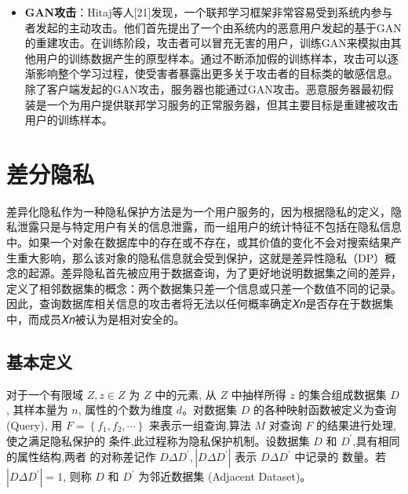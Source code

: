 \begin{itemize}
\item \textbf{GAN攻击}：Hitaj等人[21]发现，一个联邦学习框架非常容易受到系统内参与者发起的主动攻击。他们首先提出了一个由系统内的恶意用户发起的基于GAN的重建攻击。在训练阶段，攻击者可以冒充无害的用户，训练GAN来模拟由其他用户的训练数据产生的原型样本。通过不断添加假的训练样本，攻击可以逐渐影响整个学习过程，使受害者暴露出更多关于攻击者的目标类的敏感信息。除了客户端发起的GAN攻击，服务器也能通过GAN攻击。恶意服务器最初假装是一个为用户提供联邦学习服务的正常服务器，但其主要目标是重建被攻击用户的训练样本。

\end{itemize}


\section{差分隐私}
差异化隐私作为一种隐私保护方法是为一个用户服务的，因为根据隐私的定义，隐私泄露只是与特定用户有关的信息泄露，而一组用户的统计特征不包括在隐私信息中。如果一个对象在数据库中的存在或不存在，或其价值的变化不会对搜索结果产生重大影响，那么该对象的隐私信息就会受到保护，这就是差异性隐私（DP）概念的起源。差异隐私首先被应用于数据查询，为了更好地说明数据集之间的差异，定义了相邻数据集的概念：两个数据集只差一个信息或只差一个数值不同的记录。因此，查询数据库相关信息的攻击者将无法以任何概率确定𝑋𝑛是否存在于数据集中，而成员𝑋𝑛被认为是相对安全的。


\subsection{基本定义}
对于一个有限域 $Z, z \in Z$ 为 $Z$ 中的元素, 从 $Z$ 中抽样所得 $z$ 的集合组成数据集 $D$, 其样本量为 $n$, 属性的个数为维度 $d$。对数据集 $D$ 的各种映射函数被定义为查询 (Query), 用 $F=\left\{f_{1}, f_{2}, \cdots\right\}$ 来表示一组查询,算法 $M$ 对查询 $F$ 的结果进行处理,使之满足隐私保护的 条件,此过程称为隐私保护机制。设数据集 $D$ 和 $D^{\prime}$,具有相同的属性结构,两者 的对称差记作 $D \Delta D^{\prime},\left|D \Delta D^{\prime}\right|$ 表示 $D \Delta D^{\prime}$ 中记录的 数量。若 $\left|D \Delta D^{\prime}\right|=1$, 则称 $D$ 和 $D^{\prime}$ 为邻近数据集 (Adjacent Dataset)。


